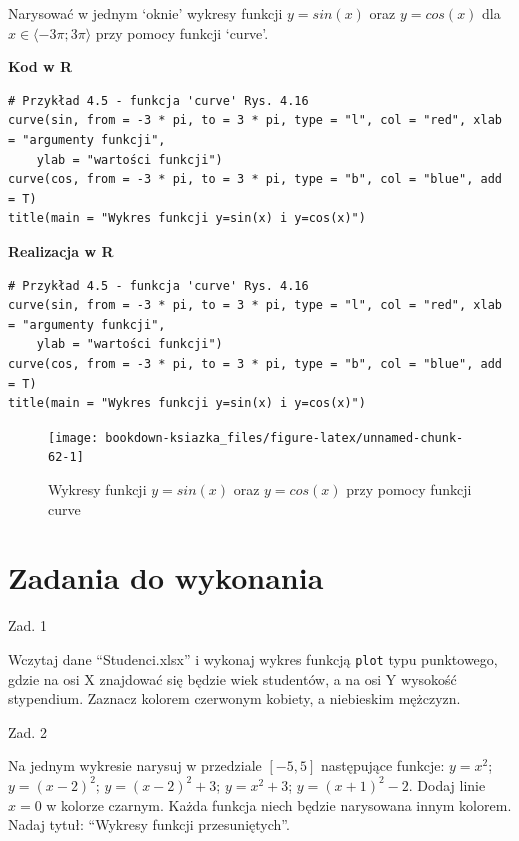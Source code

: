\documentclass[12pt,B5paper,]{book}
\begin{document}
Narysować w jednym `oknie' wykresy funkcji \(y=sin(x)\) oraz
\(y=cos(x)\) dla \(x \in \langle -3 \pi;3 \pi \rangle\) przy pomocy
funkcji `curve'.

\vspace{0.8cm} \textbf{Kod w R}

\begin{verbatim}
# Przykład 4.5 - funkcja 'curve' Rys. 4.16
curve(sin, from = -3 * pi, to = 3 * pi, type = "l", col = "red", xlab = "argumenty funkcji", 
    ylab = "wartości funkcji")
curve(cos, from = -3 * pi, to = 3 * pi, type = "b", col = "blue", add = T)
title(main = "Wykres funkcji y=sin(x) i y=cos(x)")
\end{verbatim}

\newpage

\textbf{Realizacja w R}

\begin{verbatim}
# Przykład 4.5 - funkcja 'curve' Rys. 4.16
curve(sin, from = -3 * pi, to = 3 * pi, type = "l", col = "red", xlab = "argumenty funkcji", 
    ylab = "wartości funkcji")
curve(cos, from = -3 * pi, to = 3 * pi, type = "b", col = "blue", add = T)
title(main = "Wykres funkcji y=sin(x) i y=cos(x)")
\end{verbatim}

\begin{figure}[H]

{\centering \texttt{[image: bookdown-ksiazka\_files/figure-latex/unnamed-chunk-62-1]} 

}

\caption{Wykresy funkcji $y=sin(x)$ oraz $y=cos(x)$ przy pomocy funkcji curve}\label{fig:unnamed-chunk-62}
\end{figure}

\section{Zadania do wykonania}\label{zadania-do-wykonania-3}

Zad. 1

Wczytaj dane ``Studenci.xlsx'' i wykonaj wykres funkcją \texttt{plot}
typu punktowego, gdzie na osi X znajdować się będzie wiek studentów, a
na osi Y wysokość stypendium. Zaznacz kolorem czerwonym kobiety, a
niebieskim mężczyzn.

\newpage

Zad. 2

Na jednym wykresie narysuj w przedziale \([-5, 5]\) następujące funkcje:
\(y = x^2\); \(y = (x-2)^2\); \(y = (x-2)^2+3\); \(y = x^2+3\);
\(y = (x+1)^2-2\). Dodaj linie \(x = 0\) w kolorze czarnym. Każda
funkcja niech będzie narysowana innym kolorem. Nadaj tytuł: ``Wykresy
funkcji przesuniętych''.
\end{document}
